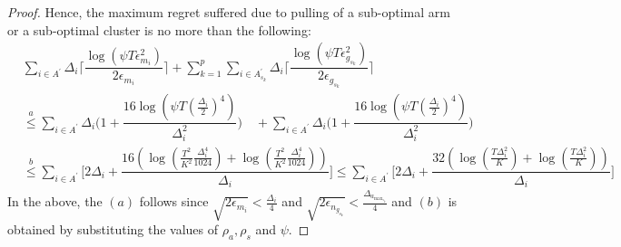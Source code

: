 \begin{proof}
Hence, the maximum regret suffered due to pulling of a sub-optimal arm or a sub-optimal cluster is no more than the following:
 \begin{align*}
 &\sum_{i\in A^{'}}\Delta_{i}\bigg\lceil\dfrac{\log{(\psi T\epsilon_{m_{i}}^{2})}}{2\epsilon_{m_{i}}}\bigg\rceil 
\!+\! \sum_{k=1}^{p}\sum_{i\in A_{s_{k}}^{'}}\Delta_{i}\bigg\lceil\dfrac{\log{(\psi T\epsilon_{g_{s_{k}}}^{2})}}{2\epsilon_{g_{s_{k}}}}\bigg\rceil \\
&\overset{a}{\leq}\sum_{i\in A^{'}}\Delta_{i}\bigg(1+\dfrac{16\log{\left(\psi T\left(\frac{\Delta_{i}}{2}\right)^{4}\right)}}{\Delta_{i}^{2}}\bigg) 
\quad+ \sum_{i\in A^{'}}\Delta_{i}\bigg(1+\dfrac{16\log{\left(\psi T\left(\frac{\Delta_{i}}{2}\right)^{4}\right)}}{\Delta_{i}^{2}}\bigg)
\\
 &\overset{b}{\leq} \sum_{i\in A^{'}}\!\bigg[ 2\Delta_{i}+\dfrac{16(\log{(\frac{T^2}{K^2}\frac{\Delta_{i}^{4}}{1024})} + \log{(\frac{T^2}{K^2}\frac{\Delta_{i}^{4}}{1024})})}{\Delta_{i}} \bigg] \leq \sum_{i\in A^{'}}\!\bigg[ 2\Delta_{i}+\dfrac{32\left(\log{(\frac{T\Delta_{i}^2}{K})} + \log{(\frac{T\Delta_{i}^2}{K})}\right)}{\Delta_{i}} \bigg]
 \end{align*}
In the above, the $(a)$ follows since $\sqrt{2\epsilon_{m_{i}}} < \frac{\Delta_{i}}{4}$ and $\sqrt{2\epsilon_{n_{g_{s_{k}}}}} < \frac{\Delta_{a_{\max_{s_{k}}}}}{4}$ and $(b)$ is obtained by substituting the values of $\rho_a,\rho_s$ and $\psi$.

 

\end{proof}
